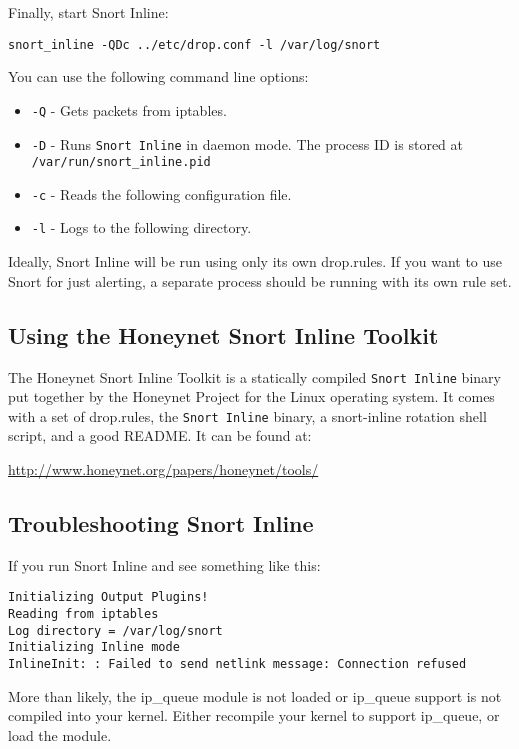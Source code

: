 \documentclass[english]{report}
\begin{document}
Finally, start Snort Inline:

\begin{verbatim}
snort_inline -QDc ../etc/drop.conf -l /var/log/snort
\end{verbatim}

You can use the following command line options:
\begin{itemize}
\item \texttt{-Q} - Gets packets from iptables.
\item \texttt{-D} - Runs \texttt{Snort Inline} in daemon mode.  The process ID is stored
                    at \texttt{/var/run/snort\_inline.pid}
\item \texttt{-c} - Reads the following configuration file.
\item \texttt{-l} - Logs to the following directory.

\end{itemize}

Ideally, Snort Inline will be run using only its own drop.rules.  If
you want to use Snort for just alerting, a separate process should be
running with its own rule set.

\subsection{Using the Honeynet Snort Inline Toolkit}

The Honeynet Snort Inline Toolkit is a statically compiled \texttt{Snort Inline} 
binary put together by the
Honeynet Project for the Linux operating system.  It comes with a set
of drop.rules, the \texttt{Snort Inline} binary, a snort-inline rotation shell
script, and a good README.  It can be found at:

\url{http://www.honeynet.org/papers/honeynet/tools/}

\subsection{Troubleshooting Snort Inline}

If you run Snort Inline and see something like this:
\begin{verbatim}
Initializing Output Plugins!
Reading from iptables
Log directory = /var/log/snort
Initializing Inline mode
InlineInit: : Failed to send netlink message: Connection refused
\end{verbatim}
More than likely, the ip\_queue module is not loaded or ip\_queue 
support is not compiled into your kernel.  Either recompile
your kernel to support ip\_queue, or load the module.
\end{document}
